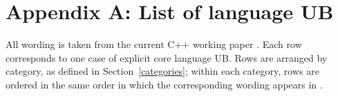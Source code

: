 

\section*{Appendix A: List of language UB}
\label{appendix}

All wording is taken from the current C++ working paper \cite{N5008}. Each row corresponds to one case of explicit core language UB. Rows are arranged by category, as defined in Section~\ref{categories}; within each category, rows are ordered in the same order in which the corresponding wording appears in \cite{N5008}.


